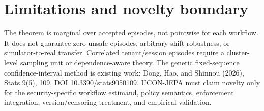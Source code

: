 \documentclass{article}
\begin{document}
\section{Limitations and novelty boundary}
The theorem is marginal over accepted episodes, not pointwise for each workflow. It does not guarantee zero unsafe episodes, arbitrary-shift robustness, or simulator-to-real transfer. Correlated tenant/session episodes require a cluster-level sampling unit or dependence-aware theory. The generic fixed-sequence confidence-interval method is existing work: Dong, Hao, and Shinnou (2026), Stats 9(5), 109, DOI 10.3390/stats9050109. UCON-JEPA must claim novelty only for the security-specific workflow estimand, policy semantics, enforcement integration, version/censoring treatment, and empirical validation.
\end{document}
